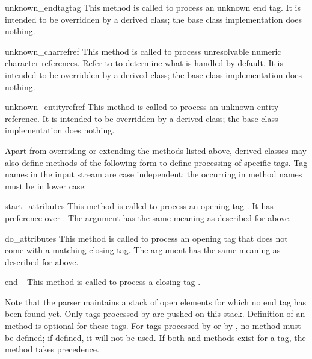\begin{methoddesc}{unknown_endtag}{tag}
This method is called to process an unknown end tag.  It is intended
to be overridden by a derived class; the base class implementation
does nothing.
\end{methoddesc}

\begin{methoddesc}{unknown_charref}{ref}
This method is called to process unresolvable numeric character
references.  Refer to  to determine what is
handled by default.  It is intended to be overridden by a derived
class; the base class implementation does nothing.
\end{methoddesc}

\begin{methoddesc}{unknown_entityref}{ref}
This method is called to process an unknown entity reference.  It is
intended to be overridden by a derived class; the base class
implementation does nothing.
\end{methoddesc}

Apart from overriding or extending the methods listed above, derived
classes may also define methods of the following form to define
processing of specific tags.  Tag names in the input stream are case
independent; the  occurring in method names must be in lower
case:

\begin{methoddescni}{start_}{attributes}
This method is called to process an opening tag .  It has
preference over .  The
 argument has the same meaning as described for
 above.
\end{methoddescni}

\begin{methoddescni}{do_}{attributes}
This method is called to process an opening tag  that does
not come with a matching closing tag.  The  argument
has the same meaning as described for  above.
\end{methoddescni}

\begin{methoddescni}{end_}{}
This method is called to process a closing tag .
\end{methoddescni}

Note that the parser maintains a stack of open elements for which no
end tag has been found yet.  Only tags processed by
 are pushed on this stack.  Definition of an
 method is optional for these tags.  For tags
processed by  or by , no
 method must be defined; if defined, it will
not be used.  If both  and
 methods exist for a tag, the
 method takes precedence.
